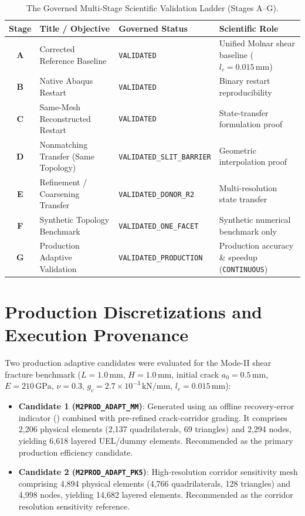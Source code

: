 \begin{table}[htbp]
\centering
\small
\caption{The Governed Multi-Stage Scientific Validation Ladder (Stages A--G).}
\label{tab:validation_ladder_ag}
\begin{tabular}{clll}
\toprule
\textbf{Stage} & \textbf{Title / Objective} & \textbf{Governed Status} & \textbf{Scientific Role} \\
\midrule
\textbf{A} & Corrected Reference Baseline & \texttt{VALIDATED} & Unified Molnar shear baseline ($l_c=0.015\,\text{mm}$) \\
\textbf{B} & Native Abaqus Restart & \texttt{VALIDATED} & Binary restart reproducibility \\
\textbf{C} & Same-Mesh Reconstructed Restart & \texttt{VALIDATED} & State-transfer formulation proof \\
\textbf{D} & Nonmatching Transfer (Same Topology) & \texttt{VALIDATED\_SLIT\_BARRIER} & Geometric interpolation proof \\
\textbf{E} & Refinement / Coarsening Transfer & \texttt{VALIDATED\_DONOR\_R2} & Multi-resolution state transfer \\
\textbf{F} & Synthetic Topology Benchmark & \texttt{VALIDATED\_ONE\_FACET} & Synthetic numerical benchmark only \\
\textbf{G} & Production Adaptive Validation & \texttt{VALIDATED\_PRODUCTION} & Production accuracy \& speedup (\texttt{CONTINUOUS}) \\
\bottomrule
\end{tabular}
\end{table}

\section{Production Discretizations and Execution Provenance}
Two production adaptive candidates were evaluated for the Mode-II shear fracture benchmark ($L = 1.0\,\text{mm}$, $H = 1.0\,\text{mm}$, initial crack $a_0 = 0.5\,\text{mm}$, $E = 210\,\text{GPa}$, $\nu = 0.3$, $g_c = 2.7\times 10^{-3}\,\text{kN/mm}$, $l_c = 0.015\,\text{mm}$):
\begin{itemize}
    \item \textbf{Candidate 1 (\texttt{M2PROD\_ADAPT\_MM})}: Generated using an offline recovery-error indicator () combined with pre-refined crack-corridor grading. It comprises 2,206 physical elements (2,137 quadrilaterals, 69 triangles) and 2,294 nodes, yielding 6,618 layered UEL/dummy elements. Recommended as the primary production efficiency candidate.
    \item \textbf{Candidate 2 (\texttt{M2PROD\_ADAPT\_PK5})}: High-resolution corridor sensitivity mesh comprising 4,894 physical elements (4,766 quadrilaterals, 128 triangles) and 4,998 nodes, yielding 14,682 layered elements. Recommended as the corridor resolution sensitivity reference.
\end{itemize}


